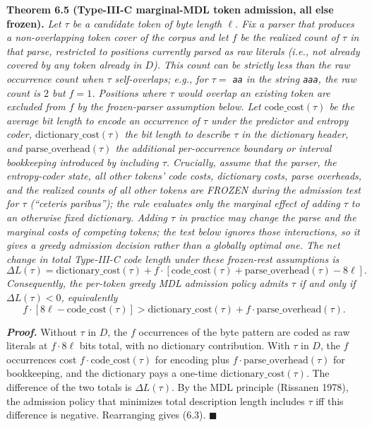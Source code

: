 \documentclass[
]{article}
\begin{document}
\textbf{Theorem 6.5 (Type-III-C marginal-MDL token admission, all
else frozen).} \emph{Let $\tau$ be a candidate token of byte length
$\ell$. Fix a parser that produces a non-overlapping token cover of
the corpus and let $f$ be the \emph{realized} count of $\tau$ in
that parse, restricted to positions currently parsed as raw
literals (i.e., not already covered by any token already in $D$).
This count can be strictly less than the raw occurrence count when
$\tau$ self-overlaps; e.g., for $\tau = $ \texttt{aa} in the
string \texttt{aaa}, the raw count is $2$ but $f = 1$. Positions
where $\tau$ would overlap an existing token are excluded from $f$
by the frozen-parser assumption below. Let
$\mathrm{code\_cost}(\tau)$ be the average bit length to encode an
occurrence of $\tau$ under the predictor and entropy coder,
$\mathrm{dictionary\_cost}(\tau)$ the bit length to describe $\tau$
in the dictionary header, and $\mathrm{parse\_overhead}(\tau)$ the
additional per-occurrence boundary or interval bookkeeping
introduced by including $\tau$. \emph{Crucially, assume that the
parser, the entropy-coder state, all other tokens' code costs,
dictionary costs, parse overheads, and the realized counts of all
other tokens are FROZEN during the admission test for $\tau$
(``ceteris paribus''); the rule evaluates only the marginal effect
of adding $\tau$ to an otherwise fixed dictionary. Adding $\tau$ in
practice may change the parse and the marginal costs of competing
tokens; the test below ignores those interactions, so it gives a
greedy admission decision rather than a globally optimal one.} The
net change in total Type-III-C code length under these frozen-rest
assumptions is}
\[
\Delta L(\tau) = \mathrm{dictionary\_cost}(\tau) + f \cdot \left[\mathrm{code\_cost}(\tau) + \mathrm{parse\_overhead}(\tau) - 8\ell\right].
\]
\emph{Consequently, the per-token greedy MDL admission policy admits
$\tau$ if and only if $\Delta L(\tau) < 0$, equivalently}
\[
f \cdot \left[8\ell - \mathrm{code\_cost}(\tau)\right] > \mathrm{dictionary\_cost}(\tau) + f \cdot \mathrm{parse\_overhead}(\tau).
\tag{6.3}
\]

\emph{\textbf{Proof.}} Without $\tau$ in $D$, the $f$ occurrences of
the byte pattern are coded as raw literals at $f \cdot 8\ell$ bits
total, with no dictionary contribution. With $\tau$ in $D$, the $f$
occurrences cost $f \cdot \mathrm{code\_cost}(\tau)$ for encoding plus
$f \cdot \mathrm{parse\_overhead}(\tau)$ for bookkeeping, and the
dictionary pays a one-time $\mathrm{dictionary\_cost}(\tau)$. The
difference of the two totals is $\Delta L(\tau)$. By the MDL
principle (Rissanen 1978), the admission policy that minimizes total
description length includes $\tau$ iff this difference is negative.
Rearranging gives (6.3). \hfill$\blacksquare$
\end{document}
